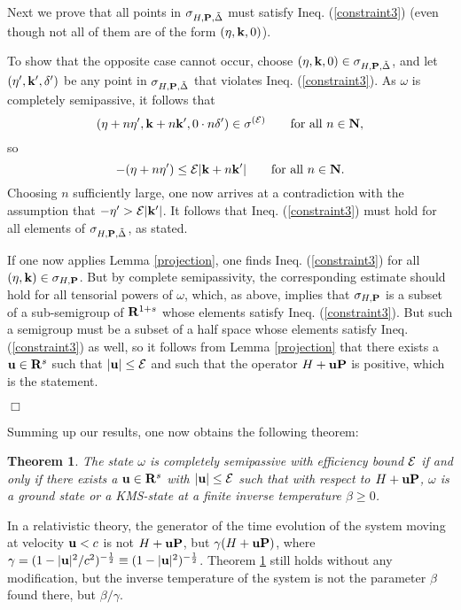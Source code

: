 \documentclass[a4paper,11pt]{article}
\newtheorem{theorem}{Theorem}[section]{\bf}{\it}
\renewcommand{\forall}{\mbox{for all}\,\,}
\def\E{{\cal E}}
\def\go{\omega}
\def\Halmos{\quad\hfill$\Box$}
\def\impuls{k}
\def\naturals{{\bf N}}
\def\Rd{\reals^{1+s}}
\def\reals{{\bf R}}
\begin{document}
Next we prove that
all points in $\sigma_{H,{\bf P},\tilde\Delta}$ must satisfy Ineq.
(\ref{constraint3}) (even though not all of them are
of the form $(\eta,{\bf k},0)$).

To show that the opposite case cannot occur, choose
$(\eta,{\bf k},0)\in\sigma_{H,{\bf P},\tilde\Delta}$, and
let $(\eta',{\bf\impuls}',\delta')$ be any point
in $\sigma_{H,{\bf P},\tilde\Delta}$ that violates
Ineq. (\ref{constraint3}). As $\go$ is completely
semipassive, it follows that
$$(\eta+n\eta',{\bf\impuls}+n{\bf\impuls}',0\cdot n\delta')\in\sigma^{(\E)}
\qquad\forall n\in\naturals,$$
so
$$-(\eta+n\eta')\leq\E|{\bf\impuls}+n{\bf\impuls}'|
\qquad\forall n\in\naturals.$$
Choosing $n$ sufficiently
large, one now arrives at a contradiction with
the assumption that $-\eta'>\E|{\bf\impuls}'|$. It follows
that Ineq. (\ref{constraint3}) must hold for all elements of
$\sigma_{H,{\bf P},\tilde\Delta}$, as stated.

If one now applies Lemma \ref{projection}, one finds Ineq.
(\ref{constraint3}) for all $(\eta,{\bf k})\in\sigma_{H,{\bf P}}$.
But by complete semipassivity, the corresponding estimate
should hold for all tensorial powers of $\go$, which, as above,
implies that $\sigma_{H,{\bf P}}$ is a subset of
a sub-semigroup of $\Rd$ whose elements satisfy Ineq.
(\ref{constraint3}). But such a semigroup must be a subset of a
half space whose elements satisfy Ineq. (\ref{constraint3}) as well,
so it follows from Lemma \ref{projection} that there exists
a ${\bf u}\in\reals^s$ such that $|{\bf u}|\leq\E$ and such that
the operator $H+{\bf uP}$ is positive, which is the statement.

\Halmos

\bigskip
Summing up our results, one now obtains the following theorem:

\begin{theorem}\label{Hauptsatz}
The state $\go$ is completely semipassive with efficiency bound
$\E$ if and only if there exists a ${\bf u}\in\reals^s$ with
$|{\bf u}|\leq\E$ such that with respect to $H+{\bf uP}$,
$\go$ is a ground state or a KMS-state at a finite
inverse temperature $\beta\geq0$.
\end{theorem}

In a relativistic theory,
the generator of the time evolution of the system moving at
velocity ${\bf u}<c$ is not $H+{\bf u}{\bf P}$, but
$\gamma(H+{\bf u} {\bf P})$,
where $\gamma=(1-|{\bf u}|^2/c^2)^{-\frac{1}{2}}\equiv
(1-|{\bf u}|^2)^{-\frac{1}{2}}$. Theorem
\ref{Hauptsatz} still holds without any modification, but the
inverse temperature of the system is not the
parameter $\beta$ found there, but
$\beta/\gamma$.
\end{document}
